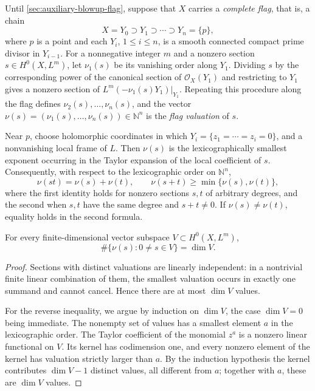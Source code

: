 Until \cref{sec:auxiliary-blowup-flag}, suppose that $X$ carries a \emph{complete flag}, that is, a chain
\[
 X=Y_0\supset Y_1\supset\cdots\supset Y_n=\{p\},
\]
where $p$ is a point and each $Y_i$, $1\leq i\leq n$, is a smooth connected compact prime divisor in $Y_{i-1}$. For a nonnegative integer $m$ and a nonzero section $s\in H^0(X,L^m)$, let $\nu_1(s)$ be its vanishing order along $Y_1$. Dividing $s$ by the corresponding power of the canonical section of $\mathcal O_X(Y_1)$ and restricting to $Y_1$ gives a nonzero section of $L^m(-\nu_1(s)Y_1)|_{Y_1}$. Repeating this procedure along the flag defines $\nu_2(s),\ldots,\nu_n(s)$, and the vector $\nu(s)=(\nu_1(s),\ldots,\nu_n(s))\in\mathbb N^n$ is the \emph{flag valuation} of $s$.

Near $p$, choose holomorphic coordinates in which $Y_i=\{z_1=\cdots=z_i=0\}$, and a nonvanishing local frame of $L$. Then $\nu(s)$ is the lexicographically smallest exponent occurring in the Taylor expansion of the local coefficient of $s$. Consequently, with respect to the lexicographic order on $\mathbb N^n$,
\[
 \nu(st)=\nu(s)+\nu(t),
 \qquad \nu(s+t)\geq\min\{\nu(s),\nu(t)\},
\]
where the first identity holds for nonzero sections $s,t$ of arbitrary degrees, and the second when $s,t$ have the same degree and $s+t\neq0$. If $\nu(s)\neq\nu(t)$, equality holds in the second formula.

\begin{lemma}\label{lem:flag-one-dimensional-leaves}
For every finite-dimensional vector subspace $V\subset H^0(X,L^m)$,
\[
 \#\{\nu(s):0\neq s\in V\}=\dim V.
\]
\end{lemma}
\begin{proof}
Sections with distinct valuations are linearly independent: in a nontrivial finite linear combination of them, the smallest valuation occurs in exactly one summand and cannot cancel. Hence there are at most $\dim V$ values.

For the reverse inequality, we argue by induction on $\dim V$, the case $\dim V=0$ being immediate. The nonempty set of values has a smallest element $a$ in the lexicographic order. The Taylor coefficient of the monomial $z^a$ is a nonzero linear functional on $V$. Its kernel has codimension one, and every nonzero element of the kernel has valuation strictly larger than $a$. By the induction hypothesis the kernel contributes $\dim V-1$ distinct values, all different from $a$; together with $a$, these are $\dim V$ values.
\end{proof}

